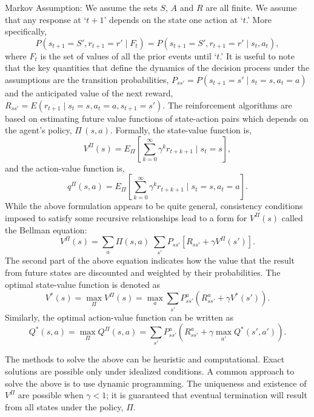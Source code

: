 \noindent Markov Assumption: We assume the sets $S$, $A$ and $R$ are all finite. We assume that any response at `$t+1$' depends on the state one action at `$t$.' More specifically, 
	\begin{equation} \label{eqn:pstpone}
	P(s_{t+1}=S', r_{t+1}=r'  \;|\; F_t)= P(s_{t+1}=S', r_{t+1}=r'  \;|\; s_t,a_t),
	\end{equation}
where $F_t$ is the set of values of all the prior events until `$t$.' It is useful to note that the key quantities that define the dynamics of the decision process under the assumptions are the transition probabilities, $P_{ss'}= P(s_{t+1}=s' \;|\; s_t=s, a_t=a)$ and the anticipated value of the next reward, $R_{ss'}= E(r_{t+1} \;|\; s_t= s, a_t= a, s_{t+1}= s')$. The reinforcement algorithms are based on estimating future value functions of state-action pairs which depends on the agent's policy, $\Pi\, (s,a)$. Formally, the state-value function is,
	\begin{equation} \label{eqn:statevalue}
	V^\Pi(s)= E_\Pi \left[ \sum_{k=0}^\infty \gamma^k r_{t+k+1} \;|\; s_t=s \right],
	\end{equation}
and the action-value function is,
	\begin{equation} \label{eqn:actionvalue}
	q^\Pi(s,a)= E_\Pi \left[ \sum_{k=0}^\infty \gamma^k r_{t+k+1} \;|\; s_t=s, a_t=a \right].
	\end{equation}
While the above formulation appears to be quite general, consistency conditions imposed to satisfy some recursive relationships lead to a form for $V^\Pi(s)$ called the Bellman equation:
	\begin{equation} \label{eqn:vprods}
	V^\Pi(s)= \sum_a \Pi (s,a) \; \sum_{s'} P_{ss'} [ R_{ss'} + \gamma V^\Pi(s')].
	\end{equation}
The second part of the above equation indicates how the value that the result from future states are discounted and weighted by their probabilities. The optimal state-value function is denoted as
	\begin{equation} \label{eqn:statevstar}
	V^*(s)= \max_\Pi V^\Pi(s)= \max_a \sum_{s'} P_{ss'}^a(R_{ss'}^a + \gamma V^*(s')).
	\end{equation}
Similarly, the optimal action-value function can be written as
	\begin{equation} \label{eqn:actionvalueqstar}
	Q^*(s,a)= \max_\Pi Q^\Pi(s,a)= \sum_{s'} P_{ss'}^a( R_{ss'}^a + \gamma \max_{a'} Q^*(s',a') ).
	\end{equation}


The methods to solve the above can be heuristic and computational. Exact solutions are possible only under idealized conditions. A common approach to solve the above is to use dynamic programming. The uniqueness and existence of $V^\Pi$ are possible when $\gamma < 1$; it is guaranteed that eventual termination will result from all states under the policy, $\Pi$. 



